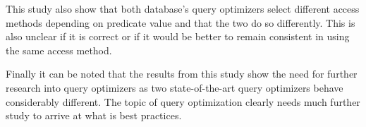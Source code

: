 This study also show that both database's query optimizers select
different access methods depending on predicate value and that the two do so
differently. This is also unclear if it is correct or if it would be better to
remain consistent in using the same access method.

Finally it can be noted that the results from this study show the need for
further research into query optimizers as two state-of-the-art query optimizers
behave considerably different. The topic of query optimization clearly needs
much further study to arrive at what is best practices.

